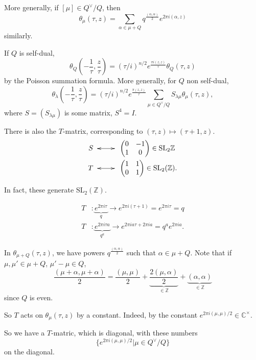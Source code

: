 More generally, if
$[\mu] \in Q^\vee/Q$, then
$$
\theta_\mu(\tau,z)=\sum_{\alpha \in
\mu+Q}q^{\frac{(\alpha,\alpha)}{2}}
e^{2\pi i (\alpha,z)}
$$
similarly.

\medskip\noindent
If $Q$ is self-dual,
$$
\theta_Q\left(-\frac{1}{\tau},\frac{z}{\tau}
\right)
=(\tau/i)^{n/2}e^{\frac{\pi i (z,z)}{\tau}}
\theta_Q(\tau,z)
$$
by the Poisson summation formula.
More generally, for $Q$ non self-dual,
$$
\theta_\lambda\left(-\frac{1}{\tau},\frac{z}
{\tau}\right)
=(\tau/i)^{n/2}e^{\frac{\pi(z,z)}{\tau}}
\sum_{\mu \in
Q^\vee/Q}S_{\lambda\mu}\theta_\mu(\tau,z),
$$
where $S=(S_{\lambda\mu})$ is some matrix,
$S^4=I$.

\begin{remark}
\label{remark-t-matrix}
There is also the $T$-matrix, corresponding
to
$(\tau,z)\mapsto (\tau+1,z)$.
\begin{align*}
S&\xymatrix{\ar@{<->}[r]&}
\begin{pmatrix}
0&-1\\
1&0
\end{pmatrix}\in \text{SL}_2\mathbb{Z}\\
T & \xymatrix{\ar@{<->}[r]&}
\begin{pmatrix}
1&1\\
0&1
\end{pmatrix}\in \text{SL}_2(\mathbb{Z}).
\end{align*}

\noindent
In fact, these generate
$\text{SL}_2(\mathbb{Z})$.
\end{remark}

$$
\begin{aligned}
T&:\underbrace{e^{2\pi i \tau}}_{q}\to
e^{2\pi i(\tau+1)}
=e^{2\pi i \tau}=q\\
T&:\underbrace{e^{2\pi i\tau a}}_{q^a}\to
e^{2\pi i a \tau+2\pi i a}=q^ae^{2\pi i a}.
\end{aligned}
$$

\medskip\noindent
In $\theta_{\mu+Q}(\tau,z)$,
we have powers
$q^{\frac{(\alpha,\alpha)}{2}}$ such that
$\alpha \in \mu+Q$.
Note that if $\mu,\mu' \in \mu+Q$, $\mu'-\mu
\in Q$,
$$
\frac{(\mu+\alpha,\mu+\alpha)}{2}
=\frac{(\mu,\mu)}{2}
+\underbrace{\frac{2(\mu,\alpha)}{2}}_{\in
\mathbb{Z}}
+\underbrace{(\alpha,\alpha)}_{\in
\mathbb{Z}}
$$
since $Q$ is even.

So $T$ acts on $\theta_\mu(\tau,z)$
by a constant. Indeed, by the constant
$e^{2\pi i (\mu,\mu)/2} \in
\mathbb{C}^\times$.

So we have a $T$-matric, which is diagonal,
with these numbers
$$
\{e^{2\pi i (\mu,\mu)/2}|\mu \in Q^\vee/Q\}
$$
on the diagonal.

